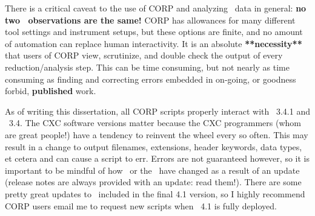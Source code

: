There is a critical caveat to the use of CORP and analyzing
\chandra\ data in general: {\bf{no two \chandra\ observations are the
same!}} CORP has allowances for many different tool settings and
instrument setups, but these options are finite, and no amount of
automation can replace human interactivity. It is an absolute
{\bf{**necessity**}} that users of CORP view, scrutinize, and double
check the output of every reduction/analysis step. This can be time
consuming, but not nearly as time consuming as finding and correcting
errors embedded in on-going, or goodness forbid, {\bf{published}}
work.

As of writing this dissertation, all CORP scripts properly interact
with \ciao\ 3.4.1 and \caldb\ 3.4. The CXC software versions matter
because the CXC programmers (whom are great people!) have a tendency
to reinvent the wheel every so often. This may result in a change to
output filenames, extensions, header keywords, data types, et cetera
and can cause a script to err. Errors are not guaranteed however, so
it is important to be mindful of how \ciao\ or the \caldb\ have
changed as a result of an update (release notes are always provided
with an update: read them!). There are some pretty great updates to
\ciao\ included in the final 4.1 version, so I highly recommend
CORP users email me to request new scripts when \ciao\ 4.1 is fully
deployed.

